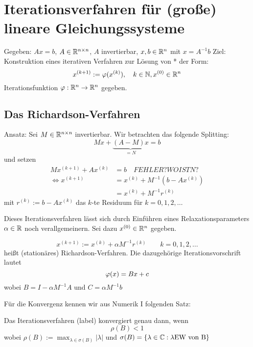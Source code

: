 \chapter[Iterationsverfahren für lineare Gleichungssysteme]{Iterationsverfahren für (große) lineare Gleichungssysteme}
Gegeben: $Ax=b$, $A\in \mathbb{R}^{n\times n}$, $A$ invertierbar, $x,b \in \mathbb{R}^n$ mit $x=A^{-1}b$
Ziel: Konstruktion eines iterativen Verfahren zur Lösung von * der Form:
\begin{equation}
  x^{(k+1)} := \varphi(x^{(k)}),\quad k\in \mathbb{N}, x^{(0)} \in \mathbb{R}^n
  \label{}
\end{equation}
Iterationsfunktion $\varphi: \mathbb{R}^n \to \mathbb{R}^n$ gegeben.

\section{Das Richardson-Verfahren}
Ansatz: Sei $M\in \mathbb{R}^{n\times n}$ invertierbar. Wir betrachten das folgende Splitting:
\begin{equation}
  Mx + \underbrace{(A-M)x}_{=N}= b
  \label{}
\end{equation}
und setzen 
\begin{equation}
  \begin{split}
    Mx^{(k+1)} + Ax^{(k)}     &= b \quad FEHLER? WO IST N?\\
    \Leftrightarrow x^{(k+1)} &= x^{(k)} + M^{-1}(b-Ax^{(k)})\\
    &= x^{(k)} + M^{-1}r^{(k)}
  \end{split}
  \label{}
\end{equation}
mit $ r^{(k)} := b-Ax^{(k)}$ das $k$-te Residuum für $k=0,1,2,\dots$

 Dieses Iterationsverfahren lässt sich durch Einführen eines Relaxationsparameters $\alpha \in \mathbb{R}$ noch verallgemeinern. Sei dazu $x^{(0)}\in \mathbb{R}^n$ gegeben. 

\begin{definition}
   \label{richardson}
   \[
     x^{(k+1)} := x^{(k)} + \alpha M^{-1} r^{(k)} \qquad k=0,1,2,\dots
   \]
   heißt (stationäres) Richardson-Verfahren. Die dazugehörige Iterationsvorschrift lautet
   \[
     \varphi(x) = Bx + c\\
   \]
   wobei $B=I-\alpha M^{-1}A$ und $C=\alpha M^{-1}b$
\end{definition}


Für die Konvergenz kennen wir aus Numerik I folgenden Satz:

\begin{satz}
  \label{itkonvergenz}
  Das Iterationsverfahren (label) konvergiert genau dann, wenn 
  \begin{equation}
    \rho (B) < 1 
    \label{}
  \end{equation}
  wobei $\rho(B) := \max_{\lambda \in \sigma(B)} |\lambda|$ und $\sigma(B) = \left\{ \lambda\in \mathbb{C}: \lambda \text{EW von B} \right\}$
\end{satz}

